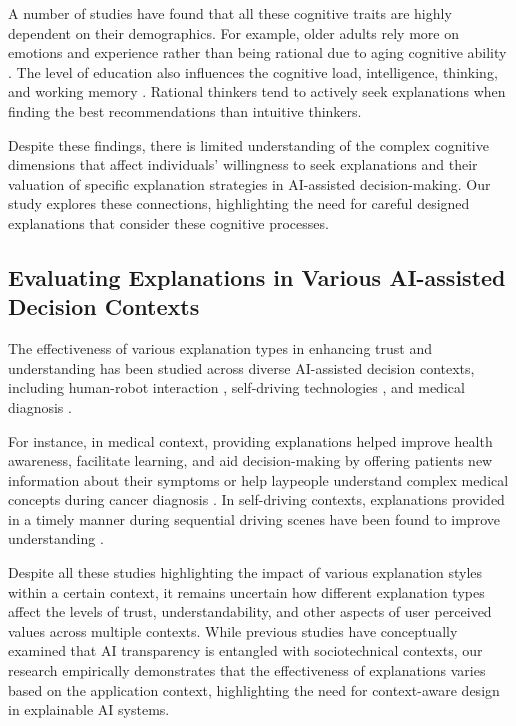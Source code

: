 A number of studies \cite{PartneringPeopleDeepLearning, Doeshighereducationhonecognitive, Domainspecificpreferencesintuitiondeliberationdecision} have found that all these cognitive traits are highly dependent on their demographics. For example, older adults rely more on emotions and experience rather than being rational due to aging cognitive ability \cite{lockenhoff2018aging}. The level of education also influences the cognitive load, intelligence, thinking, and working memory \cite{Doeshighereducationhonecognitive}.  Rational thinkers tend to actively seek explanations when finding the best recommendations than intuitive thinkers. 

Despite these findings, there is limited understanding of the complex cognitive dimensions that affect individuals' willingness to seek explanations and their valuation of specific explanation strategies in AI-assisted decision-making. Our study explores these connections, highlighting the need for careful designed explanations that consider these cognitive processes. 


\subsection{Evaluating Explanations in Various AI-assisted Decision Contexts}
\label{sec:related-work-context}

The effectiveness of various explanation types in enhancing trust and understanding has been studied across diverse AI-assisted decision contexts, including human-robot interaction \cite{ExplainableAgentsRobotsResults, GuidelinesDevelopingExplainableCognitive, SelfExplainingSocialRobotsVerbal, TheoryExplanationsHumanRobotCollaboration, DifferentXAIDifferentHRI}, self-driving technologies \cite{ExplainableAutonomyStudyExplanation, TextualExplanationsSelfDrivingVehicles, TrustingXAIEffectsdifferenttypes}, and medical diagnosis \cite{humanbodyblackboxsupporting, EffectExplanationStylesUser, jimenez2020drug}.

For instance, in medical context, providing explanations helped improve health awareness, facilitate learning, and aid decision-making by offering patients new information about their symptoms \cite{ExploringPromotingDiagnosticTransparency} or help laypeople understand complex medical concepts during cancer diagnosis \cite{EffectExplanationStylesUser}. In self-driving contexts, explanations provided in a timely manner during sequential driving scenes have been found to improve understanding \cite{TrustingXAIEffectsdifferenttypes, ExplainableAutonomyStudyExplanation, TextualExplanationsSelfDrivingVehicles}.

Despite all these studies highlighting the impact of various explanation styles within a certain context, it remains uncertain how different explanation types affect the levels of trust, understandability, and other aspects of user perceived values across multiple contexts. While previous studies \cite{CapturingTrendsApplicationsIssues, ScienceHumanAIDecisionMakingSurvey, ehsan2023charting} have conceptually examined that AI transparency is entangled with sociotechnical contexts, our research empirically demonstrates that the effectiveness of explanations varies based on the application context, highlighting the need for context-aware design in explainable AI systems.